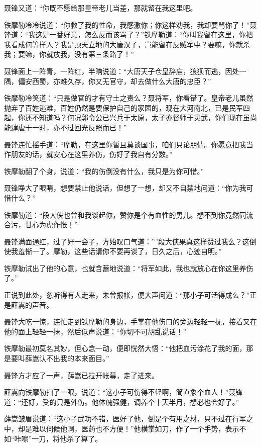 \documentclass[12pt,oneside]{book}
\begin{document}
聂锋又道：``你既不愿给那皇帝老儿当差，那就留在我这里吧。

铁摩勒冷冷说道：``你救了我的性命，我感激你；你这样劝我，我却要骂你了！''聂锋道：``我这是一番好意，怎么反而该骂了？''铁摩勒道：``你叫我留在这里，你把我看成何等样人？我是顶天立地的大唐汉子，岂能留在反贼军中？要嘛，你就杀我；要嘛，你就放我，没有第三条路了！''

聂锋面上一阵青，一阵红，半晌说道：``大唐天子仓皇辞庙，狼狈而逃，因处一隅，偏安西蜀，亦难久存，你又无官守，却去做什么大唐的忠臣？''

铁摩勒冷笑道：``只是做官的才有守土之责么？聂将军，你看错了。皇帝老儿虽然抛弃了百姓逃难，百姓仍然是要保护自己的家园的，现在大河南北，已是民军四起，你还不知道吗？何况郭令公已兴兵于太原，太子亦督师于灵武，你们现在虽尚能肆虐于一时，亦不过回光反照而已！''

聂锋连忙摇手道：``摩勒，在这里你暂且莫谈国事，咱们只论朋情。你愿意把我当作朋友的话，就安心在这里养伤，伤好了我自有分数。''

铁摩勒翻了个身，说道：``我的伤倒没有什么，我只是为你可惜。''

聂锋睁大了眼睛，想要禁止他说话，但想了一想，却又不自禁地问道：``你为我可惜什么？''

铁摩勒道：``段大侠也曾和我谈起你，赞你是个有血性的男儿。想不到你竟然同流合污，甘心为虎作怅！''

聂锋满面通红，过了好一会子，方始叹口气道：''\,'段大侠果真这样赞过我么？这倒使我羞惭一了。摩勒，这些话请你不要再谈了，日久之后，心迹自明。''

铁摩勒试出了他的心意，也就含蓄地说道：``将军如此，我也就放心在你这里养伤了。''

正说到此处，忽听得有人走来，未曾报帐，便大声问道：``那小子可活得成么？''正是薛嵩的声音。

聂锋大吃一惊，连忙走到铁摩勒的身边，手掌在他伤口的旁边轻轻一抚，接着又在他的面上轻轻一抹，然后低声说道：``你切不可胡乱说话！''

铁摩勒最初莫名其妙，但心念一动，便即恍然大悟：``他把血污涂花了我的面，那是要叫薛嵩认不出我的本来面目。''

聂锋方才应了一声，薛嵩已拉开帐幕，走了进来。

薛嵩向铁摩勒扫了一眼，说道：``这小子可伤得不轻啊，简直象个血人！''聂锋道：``还好，受的只是外伤。他体魄强健，调养个十天半月，想必也会好了。''

薛嵩皱眉说道：``这小子武功不错，医好了他，倒是个有用之材，只不过在行军之中，却是难以伺候他啊，医药也不方便！''他横掌如刀，作了一个手势，表示不如``咔嚓''一刀，将他杀了算了。
\end{document}
